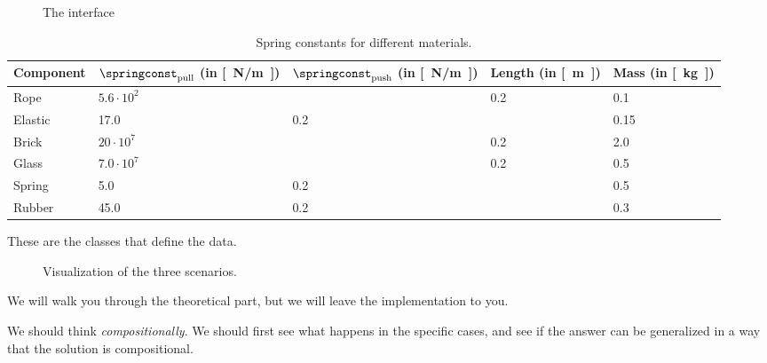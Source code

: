 \begin{figure}
\caption{The  interface}
\label{fig:RupeGoldbergSolver}
\end{figure}

\begin{table}
  \begin{center}
\begin{tabular}{lllll}
  Component & $\springconst_\mathrm{pull}$ (in \unit[]{[N/m]})&$\springconst_\mathrm{push}$ (in \unit[]{[N/m]})& Length (in \unit[]{[m]})&Mass (in \unit[]{[kg]})\\
  \toprule
  Rope & $5.6\cdot 10^2$&&0.2&0.1 \\
  Elastic & 17.0&0.2&&0.15 \\
  Brick & $20\cdot 10^7$&&0.2&2.0\\
  Glass & $7.0\cdot 10^7$&&0.2&0.5\\
  Spring & 5.0&0.2&&0.5\\
  Rubber & 45.0&0.2&&0.3
\end{tabular}
  \caption{Spring constants for different materials.}
   \label{tab:spring_const}
\end{center}
\end{table}

These are the classes that define the data.



\begin{figure}
  \hfill
  \hfill
  \hfill
  \hfill
  \caption{Visualization of the three scenarios.}
\end{figure}


We will walk you through the theoretical part, but we will leave the implementation to you.

We should think \emph{compositionally}. We should first see what happens in the specific cases,
and see if the answer can be generalized in a way that the solution is compositional.

\clearpage
